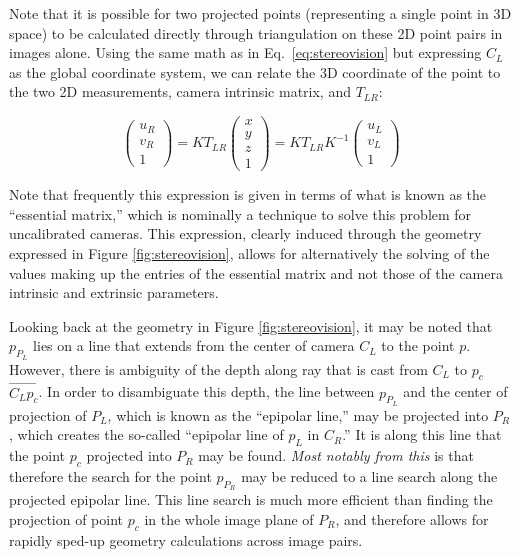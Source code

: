 Note that it is possible for two projected points (representing a single point in 3D space) to be calculated directly through triangulation on these 2D point pairs in images alone. Using the same math as in Eq.\ \eqref{eq:stereovision} but expressing $C_L$ as the global coordinate system, we can relate the 3D coordinate of the point to the two 2D measurements, camera intrinsic matrix, and $T_{LR}$:

\begin{equation}
\begin{pmatrix}
u_R\\
v_R\\
1
\end{pmatrix}
= K T_{LR} \begin{pmatrix} x \\ y \\ z \\ 1\end{pmatrix}
= K T_{LR} K^{-1} \begin{pmatrix} u_L \\ v_L \\ 1 \end{pmatrix}
\end{equation}

Note that frequently this expression is given in terms of what is known as the ``essential matrix,'' which is nominally a technique to solve this problem for uncalibrated cameras. This expression, clearly induced through the geometry expressed in Figure \ref{fig:stereovision}, allows for alternatively the solving of the values making up the entries of the essential matrix and not those of the camera intrinsic and extrinsic parameters.

Looking back at the geometry in Figure \ref{fig:stereovision}, it may be noted that $p_{P_L}$ lies on a line that extends from the center of camera $C_L$ to the point $p$. However, there is ambiguity of the depth along ray that is cast from $C_L$ to $p_c$ $\overrightarrow{C_L p_c}$. In order to disambiguate this depth, the line between $p_{P_L}$ and the center of projection of $P_L$, which is known as the ``epipolar line,'' may be projected into $P_R$, which creates the so-called ``epipolar line of $p_L$ in $C_R$.'' It is along this line that the point $p_c$ projected into $P_R$ may be found. \emph{Most notably from this} is that therefore the search for the point $p_{P_R}$ may be reduced to a line search along the projected epipolar line. This line search is much more efficient than finding the projection of point $p_c$ in the whole image plane of $P_R$, and therefore allows for rapidly sped-up geometry calculations across image pairs.

